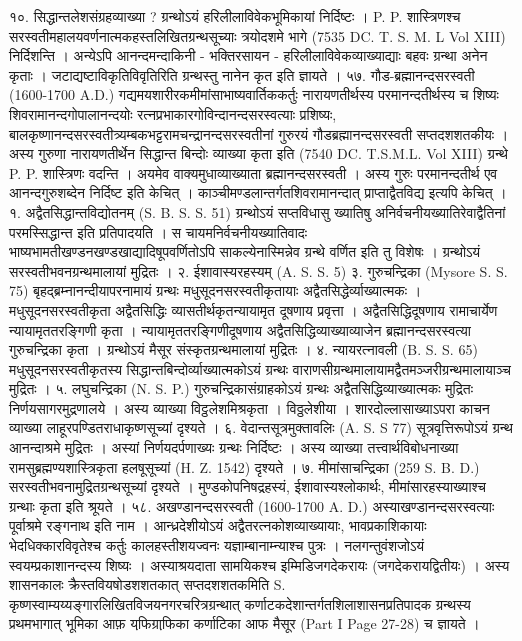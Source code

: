 १०. सिद्धान्तलेशसंग्रहव्याख्या ?
ग्रन्थोऽयं हरिलीलाविवेकभूमिकायां निर्दिष्टः । P. P. शास्त्रिणश्च सरस्वतीमहालयवर्णनात्मकहस्तलिखितग्रन्थसूच्याः त्रयोदशमे भागे (7535 DC. T. S. M. L Vol XIII) निर्दिशन्ति ।
अन्येऽपि आनन्दमन्दाकिनी - भक्तिरसायन - हरिलीलाविवेकव्याख्याद्याः बहवः ग्रन्था अनेन कृताः । जटाद्यष्टाविकृतिविवृतिरिति ग्रन्थस्तु नानेन कृत इति ज्ञायते ।
५७. गौड-ब्रह्मानन्दसरस्वती (1600-1700 A.D.)
गद्यमयशारीरकमीमांसाभाष्यवार्तिककर्तुः नारायणतीर्थस्य परमानन्दतीर्थस्य च शिष्यः शिवरामानन्दगोपालानन्दयोः रत्नप्रभाकारगोविन्दानन्दसरस्वत्याः प्रशिष्यः, बालकृष्णानन्दसरस्वतीत्र्यम्बकभट्टरामचन्द्रानन्दसरस्वतीनां गुरुरयं गौडब्रह्मानन्दसरस्वती सप्तदशशतकीयः । अस्य गुरुणा नारायणतीर्थेन सिद्धान्त बिन्दोः व्याख्या कृता इति (7540 DC. T.S.M.L. Vol XIII) ग्रन्थे P. P. शास्त्रिणः वदन्ति । अयमेव वाक्यमुधाव्याख्याता ब्रह्मानन्दसरस्वती । अस्य गुरुः परमानन्दतीर्थ एव आनन्दगुरुशब्देन निर्दिष्ट इति केचित् ।
काञ्चीमण्डलान्तर्गतशिवरामानन्दात् प्राप्ताद्वैतविद्य इत्यपि केचित् ।
१. अद्वैतसिद्धान्तविद्योतनम् (S. B. S. S. 51)
ग्रन्थोऽयं सप्तविधासु ख्यातिषु अनिर्वचनीयख्यातिरेवाद्वैतिनां परमस्सिद्धान्त इति प्रतिपादयति । स चायमनिर्वचनीयख्यातिवादः भाष्यभामतीखण्डनखण्डखाद्यादिषूपवर्णितोऽपि साकल्येनास्मिन्नेव ग्रन्थे वर्णित इति तु विशेषः । ग्रन्थोऽयं सरस्वतीभवनग्रन्थमालायां मुद्रितः ।
२. ईशावास्यरहस्यम् (A. S. S. 5)
३. गुरुचन्द्रिका (Mysore S. S. 75)
बृहद्ब्रम्नानन्दीयापरनामायं ग्रन्थः मधुसूदनसरस्वतीकृतायाः अद्वैतसिद्धेर्व्याख्यात्मकः । मधुसूदनसरस्वतीकृता अद्वैतसिद्धिः व्यासतीर्थकृतन्यायामृत दूषणाय प्रवृत्ता । अद्वैतसिद्धिदूषणाय रामाचार्येण न्यायामृततरङ्गिणी कृता । न्यायामृततरङ्गिणीदूषणाय अद्वैतसिद्धिव्याख्याव्याजेन ब्रह्मानन्दसरस्वत्या गुरुचन्द्रिका कृता । ग्रन्थोऽयं मैसूर संस्कृतग्रन्थमालायां मुद्रितः । 
४. न्यायरत्नावली (B. S. S. 65)
मधुसूदनसरस्वतीकृतस्य सिद्धान्तबिन्दोर्व्याख्यात्मकोऽयं ग्रन्थः वाराणसीग्रन्थमालायामद्वैतमञ्जरीग्रन्थमालायाञ्च मुद्रितः ।
५. लघुचन्द्रिका (N. S. P.)
गुरुचन्द्रिकासंग्राहकोऽयं ग्रन्थः अद्वैतसिद्धिव्याख्यात्मकः मुद्रितः निर्णयसागरमुद्रणालये । अस्य व्याख्या विट्ठलेशमिश्रकृता । विठ्ठलेशीया । शारदोल्लासाख्याऽपरा काचन व्याख्या लाहूरपण्डितराधाकृष्णसूच्यां दृश्यते ।
६. वेदान्तसूत्रमुक्तावलिः (A. S. S 77)
सूत्रवृत्तिरूपोऽयं ग्रन्थ आनन्दाश्रमे मुद्रितः । अस्यां निर्णयदर्पणाख्यः ग्रन्थः निर्दिष्टः । अस्य व्याख्या तत्त्वार्थविबोधनाख्या रामसुब्रह्मण्यशास्त्रिकृता हलषूसूच्यां (H. Z. 1542) दृश्यते ।
७. मीमांसाचन्द्रिका (259 S. B. D.)
सरस्वतीभवनामुद्रितग्रन्थसूच्यां दृश्यते । मुण्डकोपनिषद्रहस्यं, ईशावास्यश्लोकार्थः, मीमांसारहस्याख्याश्च ग्रन्थाः कृता इति श्रूयते ।
५८. अखण्डानन्दसरस्वती (1600-1700 A. D.)
अस्याखण्डानन्दसरस्वत्याः पूर्वाश्रमे रङ्गनाथ इति नाम । आन्ध्रदेशीयोऽयं अद्वैतरत्नकोशव्याख्यायाः, भावप्रकाशिकायाः भेदधिक्कारविवृतेश्च कर्तुः कालहस्तीशयज्वनः यज्ञाम्बानाम्न्याश्च पुत्रः । नलगन्तुवंशजोऽयं स्वयम्प्रकाशानन्दस्य शिष्यः । अस्याश्रयदाता सामयिकश्च इम्मिडिजगदेकरायः (जगदेकरायद्वितीयः) । अस्य शासनकालः क्रैस्तवियषोडशशतकात् सप्तदशशतकमिति  S. कृष्णस्वाम्यय्यङ्गारलिखितविजयनगरचरित्रग्रन्थात् कर्णाटकदेशान्तर्गतशिलाशासनप्रतिपादक ग्रन्थस्य प्रथमभागात् भूमिका आफ़ यफि़ग्राफि़का कर्णाटिका आफ मैसूर (Part I Page 27-28) च ज्ञायते ।
